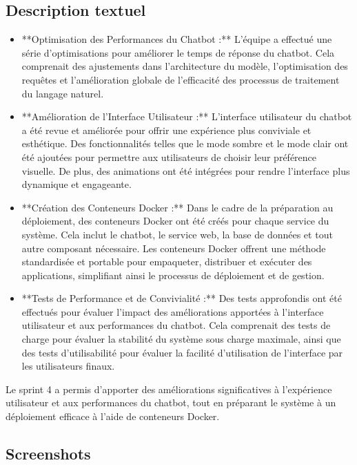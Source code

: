 \documentclass[a4paper, 11pt, openany]{report}
\begin{document}
\subsection{Description textuel}
\begin{itemize}
    \item **Optimisation des Performances du Chatbot :** L'équipe a effectué une série d'optimisations pour améliorer le temps de réponse du chatbot. Cela comprenait des ajustements dans l'architecture du modèle, l'optimisation des requêtes et l'amélioration globale de l'efficacité des processus de traitement du langage naturel.
    
    \item **Amélioration de l'Interface Utilisateur :** L'interface utilisateur du chatbot a été revue et améliorée pour offrir une expérience plus conviviale et esthétique. Des fonctionnalités telles que le mode sombre et le mode clair ont été ajoutées pour permettre aux utilisateurs de choisir leur préférence visuelle. De plus, des animations ont été intégrées pour rendre l'interface plus dynamique et engageante.
    
    \item **Création des Conteneurs Docker :** Dans le cadre de la préparation au déploiement, des conteneurs Docker ont été créés pour chaque service du système. Cela inclut le chatbot, le service web, la base de données et tout autre composant nécessaire. Les conteneurs Docker offrent une méthode standardisée et portable pour empaqueter, distribuer et exécuter des applications, simplifiant ainsi le processus de déploiement et de gestion.
    
    \item **Tests de Performance et de Convivialité :** Des tests approfondis ont été effectués pour évaluer l'impact des améliorations apportées à l'interface utilisateur et aux performances du chatbot. Cela comprenait des tests de charge pour évaluer la stabilité du système sous charge maximale, ainsi que des tests d'utilisabilité pour évaluer la facilité d'utilisation de l'interface par les utilisateurs finaux.
\end{itemize}

Le sprint 4 a permis d'apporter des améliorations significatives à l'expérience utilisateur et aux performances du chatbot, tout en préparant le système à un déploiement efficace à l'aide de conteneurs Docker.

\subsection{Screenshots}
\end{document}
